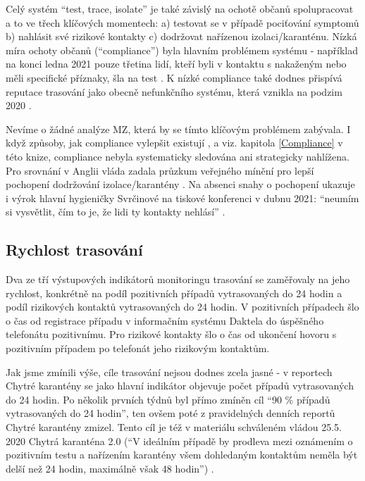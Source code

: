 Celý systém “test, trace, isolate” je také závislý na ochotě občanů spolupracovat a to ve třech klíčových momentech: a) testovat se v případě pociťování symptomů b) nahlásit své rizikové kontakty c) dodržovat nařízenou izolaci/karanténu. Nízká míra ochoty občanů (“compliance”) byla hlavním problémem systému - například na konci ledna 2021 pouze třetina lidí, kteří byli v kontaktu s nakaženým nebo měli specifické příznaky, šla na test \cite{tr_prokop01}. K nízké compliance také dodnes přispívá reputace trasování jako obecně nefunkčního systému, která vznikla na podzim 2020 \cite{tr_bisop01}.

Nevíme o žádné analýze MZ, která by se tímto klíčovým problémem zabývala. I když způsoby, jak compliance vylepšit existují \cite{tr_bisop02}, a viz. kapitola \ref{Compliance} v této knize, compliance nebyla systematicky sledována ani strategicky nahlížena. Pro srovnání v Anglii vláda zadala průzkum veřejného mínění pro lepší pochopení dodržování izolace/karantény \cite{tr_ofns}. Na absenci snahy o pochopení ukazuje i výrok hlavní hygieničky Svrčinové na tiskové konferenci v dubnu 2021: “neumím si vysvětlit, čím to je, že lidi ty kontakty nehlásí” \cite{tr_idnes01}.

\subsection*{Rychlost trasování}

Dva ze tří výstupových indikátorů monitoringu trasování se zaměřovaly na jeho rychlost, konkrétně na podíl pozitivních případů vytrasovaných do 24 hodin a podíl rizikových kontaktů vytrasovaných do 24 hodin. V pozitivních případech šlo o čas od registrace případu v informačním systému Daktela do úspěšného telefonátu pozitivnímu. Pro rizikové kontakty šlo o čas od ukončení hovoru s pozitivním případem po telefonát jeho rizikovým kontaktům.

Jak jsme zmínili výše, cíle trasování nejsou dodnes zcela jasné - v reportech Chytré karantény se jako hlavní indikátor objevuje počet případů vytrasovaných do 24 hodin. Po několik prvních týdnů byl přímo zmíněn cíl “90 \% případů vytrasovaných do 24 hodin”, ten ovšem poté z pravidelných denních reportů Chytré karantény zmizel. Tento cíl je též v materiálu schváleném vládou 25.5. 2020 Chytrá karanténa 2.0 (“V ideálním případě by prodleva mezi oznámením o pozitivním testu a nařízením karantény všem dohledaným kontaktům neměla být delší  než 24 hodin, maximálně však 48 hodin”) \cite{tr_vlada01}.


